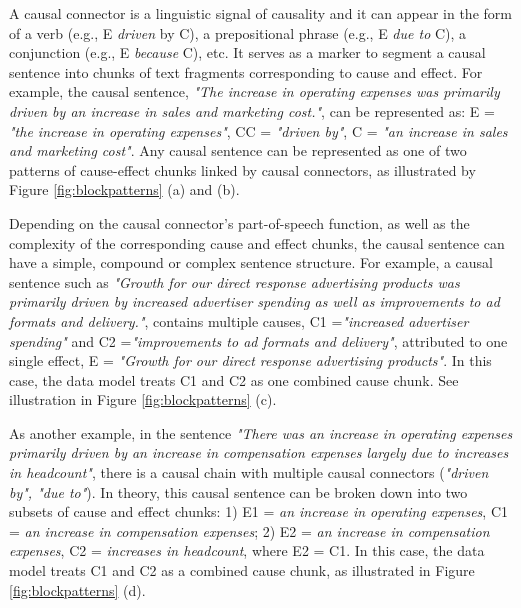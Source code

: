 \documentclass [
     12pt,         %
     a4paper,      %
     BCOR10mm,     %
     DIV14,        %
     liststotoc,   %
     bibtotoc,     %
     idxtotoc,     %
     parskip       %
     ]{scrreprt}
\begin{document}
A causal connector is a linguistic signal of causality and it can appear in the form of a verb (e.g., E \emph{driven} by C), a prepositional phrase (e.g., E \emph{due to} C), a conjunction (e.g., E \emph{because} C), etc. It serves as a marker to segment a causal sentence into chunks of text fragments corresponding to cause and effect. For example, the causal sentence, \emph{"The increase in operating expenses was primarily driven by an increase in sales and marketing cost."}, can be represented as: E = \emph{"the increase in operating expenses"}, CC = \emph{"driven by"}, C = \emph{"an increase in sales and marketing cost"}. Any causal sentence can be represented as one of two patterns of cause-effect chunks linked by causal connectors, as illustrated by Figure \ref{fig:blockpatterns} (a) and (b).  

Depending on the causal connector's part-of-speech function, as well as the complexity of the corresponding cause and effect chunks, the causal sentence can have a simple, compound or complex sentence structure. For example, a causal sentence such as \emph{"Growth for our direct response advertising products was primarily driven by increased advertiser spending as well as improvements to ad formats and delivery."}, contains multiple causes, C1 =\emph{"increased advertiser spending"} and C2 =\emph{"improvements to ad formats and delivery"}, attributed to one single effect, E = \emph{"Growth for our direct response advertising products"}. In this case, the data model treats C1 and C2 as one combined cause chunk. See illustration in Figure \ref{fig:blockpatterns} (c).

As another example, in the sentence \emph{"There was an increase in operating expenses primarily driven by an increase in compensation expenses largely due to increases in headcount"}, there is a causal chain with multiple causal connectors (\emph{"driven by", "due to"}). In theory, this causal sentence can be broken down into two subsets of cause and effect chunks: 1) E1 = \emph{an increase in operating expenses}, C1 = \emph{an increase in compensation expenses}; 2) E2 = \emph{an increase in compensation expenses}, C2 = \emph{increases in headcount}, where E2 = C1. In this case, the data model treats C1 and C2 as a combined cause chunk, as illustrated in Figure \ref{fig:blockpatterns} (d).  
\end{document}

